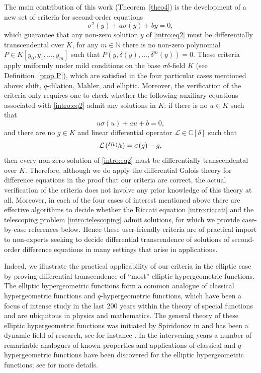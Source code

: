 The main contribution of this work (Theorem~\ref{theo4}) is the development of a new set of criteria for second-order equations
\begin{equation}\label{intro:eq2} \sigma^2(y)+a\sigma(y)+by=0,\end{equation}
which guarantee that any non-zero solution $y$ of \eqref{intro:eq2} must be differentially transcendental over $K$, \ie for any $m\in\mathbb{N}$ there is no non-zero polynomial $P\in K[y_0,y_1,\dots,y_m]$ such that $P(y,\delta(y),\dots,\delta^m(y))=0$. These criteria apply uniformly under mild conditions on the base $\sigma\delta$-field $K$ (see Definition~\ref{prop P}), which are satisfied in the four particular cases mentioned above: shift, $q$-dilation, Mahler, and elliptic. Moreover, the verification of the criteria only requires one to check whether the following auxiliary equations associated with \eqref{intro:eq2} admit any solutions in $K$: if there is no $u\in K$ such that
\begin{equation}\label{intro:riccati} u\sigma(u)+au+b=0,
\end{equation}
and there are no $g\in K$ and linear differential operator $\mathcal{L}\in\mathbb{C}[\delta]$ such that
\begin{equation}\label{intro:telescoping} \mathcal{L}\left(\sfrac{\delta(b)}{b}\right)=\sigma(g)-g,
\end{equation}
then every non-zero solution of \eqref{intro:eq2} must be differentially transcendental over $K$. Therefore, although we do apply the differential Galois theory for difference equations \cite{HS} in the proof that our criteria are correct, the actual verification of the criteria does not involve any prior knowledge of this theory at all. Moreover, in each of the four cases of interest mentioned above there are effective algorithms to decide whether the Riccati equation \eqref{intro:riccati} and the telescoping problem \eqref{intro:telescoping} admit solutions, for which we provide case-by-case references below. Hence these user-friendly criteria are of practical import to non-experts seeking to decide differential transcendence of solutions of second-order difference equations in many settings that arise in applications.\enlargethispage{.5\baselineskip}%

Indeed, we illustrate the practical applicability of our criteria in the elliptic case by proving differential transcendence of ``most'' elliptic hypergeometric functions. The elliptic hypergeometric functions form a common analogue of classical hypergeometric functions and $q$-hypergeometric functions, which have been a focus of intense study in the last 200 years within the theory of special functions and are ubiquitous in physics and mathematics. The general theory of these elliptic hypergeometric functions was initiated by Spiridonov in \cite{spiridonov2016elliptic} and has been a dynamic field of research, see for instance \cite{van2007hyperbolic,fokko2009basic,
magnus2009elliptic,rains2010transformations,
rosengren2002elliptic}. In the intervening years a number of remarkable analogues of known properties and applications of classical and $q$-hypergeometric functions have been discovered for the elliptic hypergeometric functions; see \cite{spiridonov2016elliptic} for more details.

